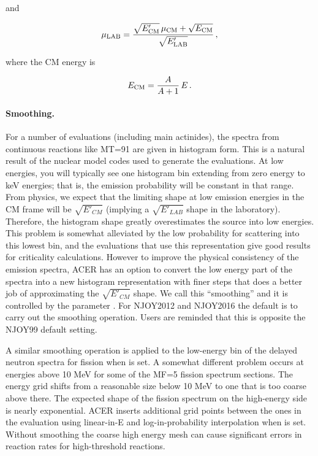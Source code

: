 \noindent
and

\begin{equation}
   \mu_{\rm LAB}=\frac{\sqrt{E'_{\rm CM}}\,\mu_{\rm CM}
    +\sqrt{E_{\rm CM}}}{\sqrt{E'_{\rm LAB}}}\,,
\end{equation}

\noindent
where the CM energy is

\begin{equation}
  E_{\rm CM}=\frac{A}{A+1}\,E\,.
\end{equation}

\paragraph{Smoothing.}

For a number of evaluations (including main
actinides), the spectra from continuous reactions like MT=91
are given in histogram form.  This is a natural result of the
nuclear model codes used to generate the evaluations.  At low
energies, you will typically see one histogram bin extending
from zero energy to keV energies;  that is, the emission
probability will be constant in that range.  From physics, we
expect that the limiting shape at low emission energies in the
CM frame will be $\sqrt{E'_{CM}}$ (implying a $\sqrt{E'_{LAB}}$
shape in the laboratory).  Therefore, the histogram shape
greatly overestimates the source into low energies.  This problem
is somewhat alleviated by the low probability for scattering
into this lowest bin, and the evaluations that use this
representation give good results for criticality calculations.
However to improve the physical consistency of the emission
spectra, ACER has an option to convert the low energy part of
the spectra into a new histogram representation with finer steps
that does a better job of approximating the $\sqrt{E'_{CM}}$ shape.
We call this ``smoothing'' and it is
controlled by the parameter .  For NJOY2012 and
NJOY2016 the default
is to carry out the smoothing operation.  Users are reminded that
this is opposite the NJOY99 default setting.

A similar smoothing operation is applied to the low-energy bin
of the delayed neutron spectra for fission when
 is set.  A somewhat different problem occurs
at energies above 10 MeV for some of the MF=5 fission spectrum
sections.  The energy grid shifts from a reasonable size below
10 MeV to one that is too coarse above there.  The expected shape
of the fission spectrum on the high-energy side is nearly
exponential.  ACER inserts additional grid points between the
ones in the evaluation using linear-in-E and log-in-probability
interpolation when  is set.  Without smoothing the coarse
high energy mesh can
cause significant errors in reaction rates for high-threshold
reactions.


